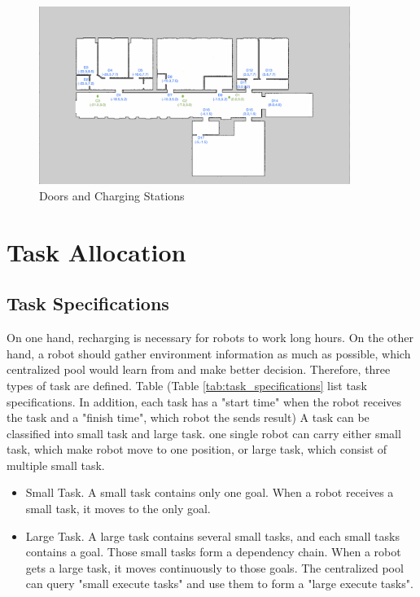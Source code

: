 \begin{figure}[htbp]
	\centering
	\includegraphics[width = 0.9\textwidth]{content/images/ch3/positions_door_station.png}
	\caption{Doors and Charging Stations}
	\label{fig:positions_door_station}
\end{figure}

\section{Task Allocation}

\subsection{Task Specifications}
\label{sec:task_specifications}
On one hand, recharging is necessary for robots to work long hours. On the other hand, a robot should gather environment information as much as possible, which centralized pool would learn from and make better decision. 
Therefore, three types of task are defined. Table (Table \ref{tab:task_specifications} list task specifications. In addition, each task has a "start time" when the robot receives the task and a "finish time", which robot the sends result)
A task can be classified into small task and large task. 
one single robot can carry either small task, which make robot move to one position, or large task, which consist of multiple small task.
\begin{itemize}
	\item Small Task. A small task contains only one goal. When a robot receives a small task, it moves to the only goal. 
	\item Large Task. A large task contains several small tasks, and each small tasks contains a goal. Those small tasks form a dependency chain. When a robot gets a large task, it moves continuously to those goals. The centralized pool can query "small execute tasks" and use them to form a "large execute tasks".
\end{itemize}

